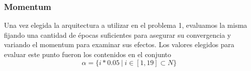 \documentclass[informe.tex]{subfiles}
\begin{document}
    \subsubsection{Momentum}
      Una vez elegida la arquitectura a utilizar en el problema 1, evaluamos la misma fijando una cantidad de \'epocas suficientes para asegurar su convergencia y variando el momentum para examinar sus efectos. Los valores elegidos para evaluar este punto fueron los contenidos en el conjunto 
      $$\alpha = \{ i*0.05\ |\ i \in [1, 19] \subset N \}$$
      
      
  
\end{document}
